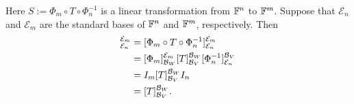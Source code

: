 \documentclass[11pt,openany]{article}
\begin{document}
\begin{observation}
Here $S:=\Phi_m\circ T\circ \Phi_n^{-1}$ is a linear transformation from $\mathbb{F}^n$ to $\mathbb{F}^m$. Suppose that $\mathcal{E}_n$ and $\mathcal{E}_m$ are the standard bases of $\mathbb{F}^n$ and $\mathbb{F}^m$, respectively. Then \begin{align*}
	[A]_{\mathcal{E}_n}^{\mathcal{E}_m} &= [\Phi_m\circ T\circ \Phi_n^{-1}]_{\mathcal{E}_n}^{\mathcal{E}_m}\\
	&=[\Phi_m]_{\basis_W}^{\mathcal{E}_m}[T]_{\basis_V}^{\basis_W}[\Phi_n^{-1}]_{\mathcal{E}_n}^{\basis_V}\\
	&=I_m[T]_{\basis_V}^{\basis_W}I_n\\
	&=[T]_{\basis_V}^{\basis_W}.
\end{align*}
\end{observation}\vspace{10pt}
\iffalse
\end{document}
